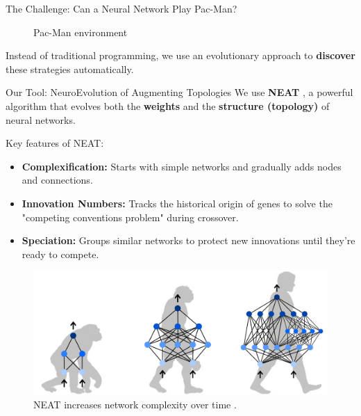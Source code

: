 \begin{frame}{The Challenge: Can a Neural Network Play Pac-Man?}
\begin{minipage}{0.45\textwidth}
\begin{figure}
			\vspace{-1em}

			\caption{\centering \small Pac-Man environment}
		\end{figure}

		\vspace{-1em}
	\end{minipage}

	Instead of traditional programming, we use an evolutionary approach to \textbf{discover} these strategies automatically.
\end{frame}

\begin{frame}{Our Tool: NeuroEvolution of Augmenting Topologies}
		We use \textbf{NEAT} \cite{stanley2002evolving}, a powerful algorithm that evolves both the \textbf{weights} and the \textbf{structure (topology)} of neural networks.

		Key features of NEAT:
		\begin{itemize}
			\item \textbf{Complexification:} Starts with simple networks and gradually adds nodes and connections.
			\item \textbf{Innovation Numbers:} Tracks the historical origin of genes to solve the "competing conventions problem" during crossover.
			\item \textbf{Speciation:} Groups similar networks to protect new innovations until they're ready to compete.
		\end{itemize}

		\vspace{-1em}
		
		\begin{figure}
			\centering
			\includegraphics[width=0.5\linewidth]{assets/neat-evolution.png}
			\vspace{-1em}
			\caption{NEAT increases network complexity over time \cite{shrestha2025reinforced}.}
		\end{figure}

\end{frame}

